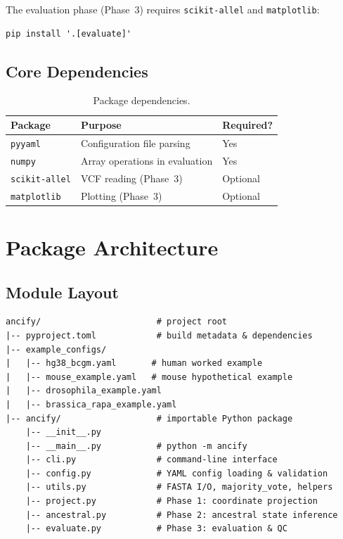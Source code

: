 \documentclass[11pt,a4paper]{article}
\begin{document}
The evaluation phase (Phase~3) requires \texttt{scikit-allel} and \texttt{matplotlib}:

\begin{lstlisting}[style=bashstyle]
pip install '.[evaluate]'
\end{lstlisting}

\subsection{Core Dependencies}

\begin{table}[H]
\centering
\caption{Package dependencies.}
\begin{tabular}{lll}
\toprule
\textbf{Package} & \textbf{Purpose} & \textbf{Required?} \\
\midrule
\texttt{pyyaml} & Configuration file parsing & Yes \\
\texttt{numpy} & Array operations in evaluation & Yes \\
\texttt{scikit-allel} & VCF reading (Phase~3) & Optional \\
\texttt{matplotlib} & Plotting (Phase~3) & Optional \\
\bottomrule
\end{tabular}
\end{table}


\section{Package Architecture}
\label{sec:architecture}

\subsection{Module Layout}

\begin{lstlisting}[style=bashstyle, caption={Package file structure.}]
ancify/                       # project root
|-- pyproject.toml            # build metadata & dependencies
|-- example_configs/
|   |-- hg38_bcgm.yaml       # human worked example
|   |-- mouse_example.yaml   # mouse hypothetical example
|   |-- drosophila_example.yaml
|   |-- brassica_rapa_example.yaml
|-- ancify/                   # importable Python package
    |-- __init__.py
    |-- __main__.py           # python -m ancify
    |-- cli.py                # command-line interface
    |-- config.py             # YAML config loading & validation
    |-- utils.py              # FASTA I/O, majority_vote, helpers
    |-- project.py            # Phase 1: coordinate projection
    |-- ancestral.py          # Phase 2: ancestral state inference
    |-- evaluate.py           # Phase 3: evaluation & QC
\end{lstlisting}
\end{document}
